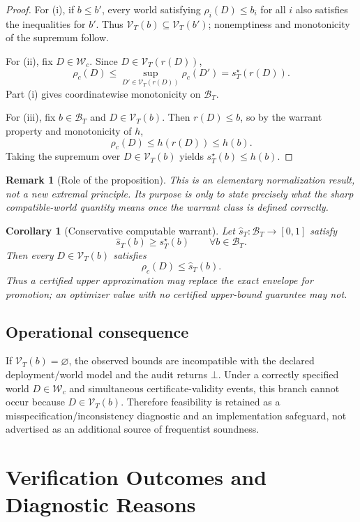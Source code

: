 \documentclass[10pt]{article}
\newtheorem{corollary}[definition]{Corollary}
\newtheorem{remark}[definition]{Remark}
\newcommand{\Wc}{\mathcal W_c}
\newcommand{\Vk}{\mathcal V_T}
\newcommand{\BT}{\mathcal B_T}
\newcommand{\riskc}{\rho_c}
\begin{document}
\begin{proof}
For (i), if \(b\le b'\), every world satisfying
\(\rho_i(D)\le b_i\) for all \(i\) also satisfies the inequalities for
\(b'\). Thus \(\Vk(b)\subseteq\Vk(b')\); nonemptiness and monotonicity
of the supremum follow.

For (ii), fix \(D\in\Wc\).  Since \(D\in\Vk(r(D))\),
\[
\riskc(D)
\le
\sup_{D'\in\Vk(r(D))}\riskc(D')
=
s_T^\star(r(D)).
\]
Part (i) gives coordinatewise monotonicity on \(\BT\).

For (iii), fix \(b\in\BT\) and \(D\in\Vk(b)\).  Then
\(r(D)\le b\), so by the warrant property and monotonicity of \(h\),
\[
\riskc(D)
\le
h(r(D))
\le
h(b).
\]
Taking the supremum over \(D\in\Vk(b)\) yields
\(s_T^\star(b)\le h(b)\).
\end{proof}

\begin{remark}[Role of the proposition]
This is an elementary normalization result, not a new extremal principle.
Its purpose is only to state precisely what the sharp compatible-world
quantity means once the warrant class is defined correctly.
\end{remark}

\begin{corollary}[Conservative computable warrant]
Let \(\widehat s_T:\BT\to[0,1]\) satisfy
\[
\widehat s_T(b)\ge s_T^\star(b)
\qquad
\forall b\in\BT.
\]
Then every \(D\in\Vk(b)\) satisfies
\[
\riskc(D)\le\widehat s_T(b).
\]
Thus a certified upper approximation may replace the exact envelope for
promotion; an optimizer value with no certified upper-bound guarantee may not.
\end{corollary}

\subsection{Operational consequence}

If \(\Vk(b)=\varnothing\), the observed bounds are incompatible with the
declared deployment/world model and the audit returns \(\bot\).  Under a
correctly specified world \(D\in\Wc\) and simultaneous certificate-validity
events, this branch cannot occur because \(D\in\Vk(b)\).  Therefore
feasibility is retained as a misspecification/inconsistency diagnostic and an
implementation safeguard, not advertised as an additional source of
frequentist soundness.

\section{Verification Outcomes and Diagnostic Reasons}
\end{document}
